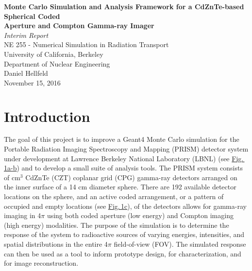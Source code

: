 \documentclass[10pt]{article}
\begin{document}
\begin{centering}
\textbf{Monte Carlo Simulation and Analysis Framework for a CdZnTe-based Spherical Coded\\[-5pt] Aperture and Compton Gamma-ray Imager}\\
\vspace{5pt}
\emph{Interim Report}\\
\vspace{5pt}
NE 255 - Numerical Simulation in Radiation Transport \\[-5pt]
University of California, Berkeley \\[-5pt]
Department of Nuclear Engineering\\
\vspace{5pt}
Daniel Hellfeld\\
\vspace{5pt}
November 15, 2016 \\
\end{centering}


\section{Introduction}

The goal of this project is to improve a Geant4 \cite{Agostinelli2003} Monte Carlo simulation for the Portable Radiation Imaging Spectroscopy and Mapping (PRISM) detector system under development at Lawrence Berkeley National Laboratory (LBNL) (see \hyperlink{fig1}{Fig.\,1a-b}) and to develop a small suite of analysis tools. The PRISM system consists of cm$^3$ CdZnTe (CZT) coplanar grid (CPG) gamma-ray detectors arranged on the inner surface of a 14 cm diameter sphere. There are 192 available detector locations on the sphere, and an active coded arrangement, or a pattern of occupied and empty locations (see \hyperlink{fig1}{Fig.\,1c}), of the detectors allows for gamma-ray imaging in 4$\pi$ using both coded aperture (low energy) and Compton imaging (high energy) modalities. The purpose of the simulation is to determine the response of the system to radioactive sources of varying energies, intensities, and spatial distributions in the entire 4$\pi$ field-of-view (FOV). The simulated response can then be used as a tool to inform prototype design, for characterization, and for image reconstruction. 
\end{document}
